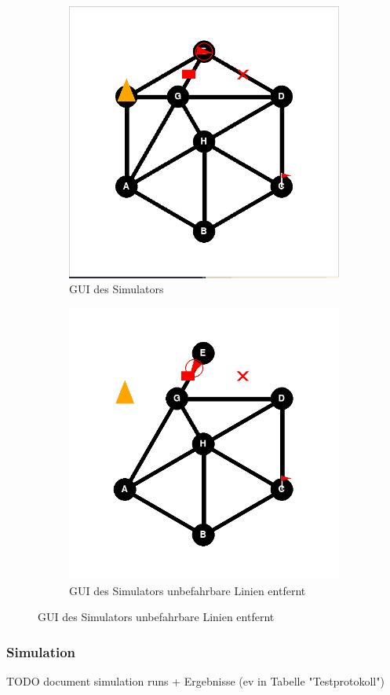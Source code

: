 \begin{figure}[H]
\begin{subfigure}{0.49\textwidth}
\includegraphics[width=\textwidth]{assets/informatik-prototyp/simulator/sim-ui.png}
\caption{GUI des Simulators}
\label{fig:sim-gui}
\end{subfigure}
\begin{subfigure}{0.49\textwidth}
\includegraphics[width=\textwidth]{assets/informatik-prototyp/simulator/removed-lines-sim.png}
\caption{GUI des Simulators unbefahrbare Linien entfernt}
\label{fig:sim-gui-removed-lines}
\end{subfigure}
\end{figure}

\subsubsection{Simulation}

TODO document simulation runs + Ergebnisse (ev in Tabelle "Testprotokoll")